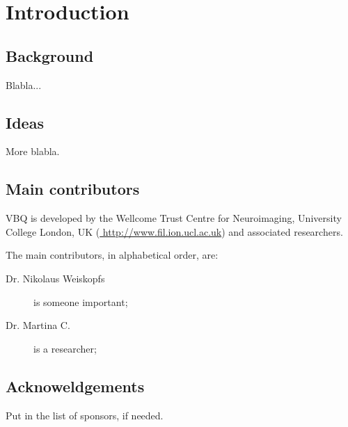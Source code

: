 
\chapter{Introduction}
\label{chap:intro}
\minitoc

\section{Background}

Blabla...

\section{Ideas}

More blabla.

\section{Main contributors}
VBQ is  developed by the Wellcome Trust Centre for Neuroimaging, University College London, UK (\url{ http://www.fil.ion.ucl.ac.uk}) and associated researchers.

The main contributors, in alphabetical order, are: 
\begin{description}
	\item[Dr. Nikolaus Weiskopfs] is someone important;
	\item[Dr. Martina C.] is a researcher;
\end{description}

\section{Acknoweldgements}
Put in the list of sponsors, if needed.